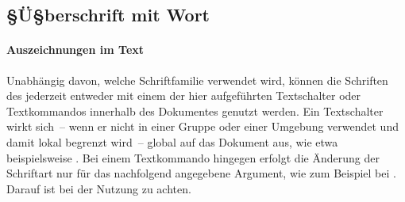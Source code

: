 \begin{Declaration*}{}
\begin{Declaration*}{}
\begin{Declaration*}{}
\begin{Example}
\begin{Code}[escapechar=§]
\chapter{§Ü§berschrift mit  Wort}
\end{Code}
\end{Example}

\subsubsection{Auszeichnungen im Text}
%
%
%
Unabhängig davon, welche Schriftfamilie verwendet wird, können die Schriften 
des \CDs jederzeit entweder mit einem der hier aufgeführten Textschalter oder 
Textkommandos innerhalb des Dokumentes genutzt werden. Ein Textschalter wirkt 
sich~-- wenn er nicht in einer Gruppe oder einer Umgebung verwendet und damit 
lokal begrenzt wird~-- global auf das Dokument aus, wie etwa beispielsweise 
. Bei einem Textkommando hingegen erfolgt die Änderung der 
Schriftart nur für das nachfolgend angegebene Argument, wie zum Beispiel bei
. Darauf ist bei der Nutzung zu achten. 
%
\begin{Declaration}{}
\begin{Declaration}{}
\begin{Declaration}{}
\begin{Declaration}{}
\begin{Declaration}{}
\begin{Declaration}{}
\begin{Declaration}{}
\begin{Declaration}{}
\begin{Declaration}{}
\begin{Declaration}{}
\begin{Declaration}{}
\begin{Declaration}{}
\begin{Declaration}{}
\begin{Declaration}{}
\begin{Declaration}{}
\begin{Declaration}{}
\begin{Declaration}{}

\end{Declaration}
\end{Declaration}
\end{Declaration}
\end{Declaration}
\end{Declaration}
\end{Declaration}
\end{Declaration}
\end{Declaration}
\end{Declaration}
\end{Declaration}
\end{Declaration}
\end{Declaration}
\end{Declaration}
\end{Declaration}
\end{Declaration}
\end{Declaration}
\end{Declaration}
\end{Declaration*}
\end{Declaration*}
\end{Declaration*}
